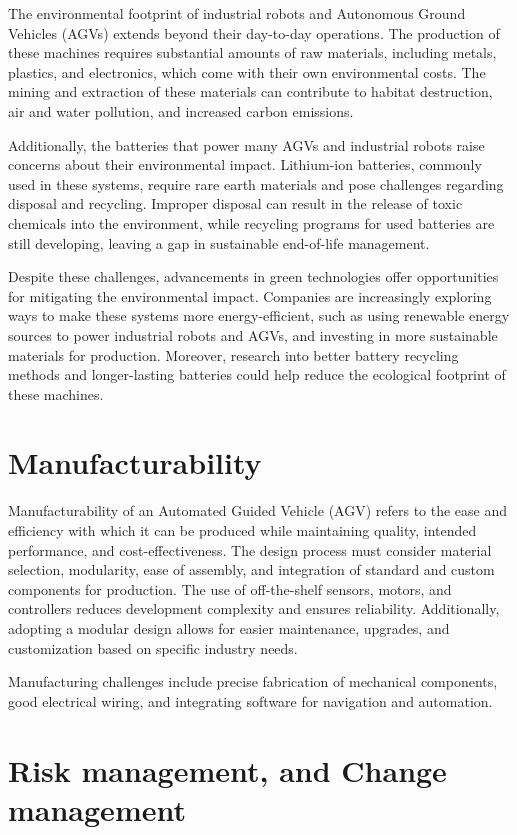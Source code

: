 \documentclass[../../main]{subfiles}
\begin{document}
The environmental footprint of industrial robots and Autonomous Ground Vehicles (AGVs) extends 
beyond their day-to-day operations. The production of these machines requires substantial amounts 
of raw materials, including metals, plastics, and electronics, which come with their own environmental costs. 
The mining and extraction of these materials can contribute to habitat destruction, air and water pollution, 
and increased carbon emissions.

Additionally, the batteries that power many AGVs and industrial robots raise concerns about their 
environmental impact. Lithium-ion batteries, commonly used in these systems, require rare earth materials 
and pose challenges regarding disposal and recycling. Improper disposal can result in the release of toxic 
chemicals into the environment, while recycling programs for used batteries are still developing, leaving a 
gap in sustainable end-of-life management.

Despite these challenges, advancements in green technologies offer opportunities for mitigating the 
environmental impact. Companies are increasingly exploring ways to make these systems more energy-efficient, 
such as using renewable energy sources to power industrial robots and AGVs, and investing in more sustainable 
materials for production. Moreover, research into better battery recycling methods and longer-lasting batteries 
could help reduce the ecological footprint of these machines.

\section{Manufacturability}

Manufacturability of an Automated Guided Vehicle (AGV) refers to the ease and efficiency with 
which it can be produced while maintaining quality, intended performance, and cost-effectiveness. 
The design process must consider material selection, modularity, ease of assembly, and integration 
of standard and custom components for production. The use of off-the-shelf sensors, motors, and 
controllers reduces development complexity and ensures reliability. Additionally, adopting a modular 
design allows for easier maintenance, upgrades, and customization based on specific industry needs.

Manufacturing challenges include precise fabrication of mechanical components, good electrical 
wiring, and integrating software for navigation and automation.

\section{Risk management, and Change management}
\end{document}
